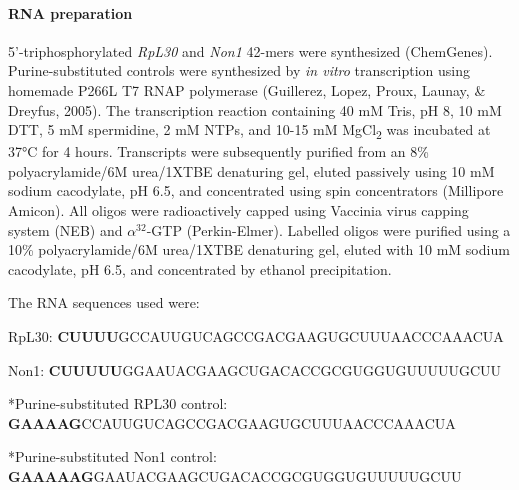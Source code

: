 \documentclass[12pt,oneside]{reedthesis}
\begin{document}
\hypertarget{rna-preparation}{%
\paragraph{RNA preparation}\label{rna-preparation}}

5'-triphosphorylated \emph{RpL30} and \emph{Non1} 42-mers were synthesized (ChemGenes). Purine-substituted controls were synthesized by \emph{in vitro} transcription using homemade P266L T7 RNAP polymerase (Guillerez, Lopez, Proux, Launay, \& Dreyfus, 2005). The transcription reaction containing 40 mM Tris, pH 8, 10 mM DTT, 5 mM spermidine, 2 mM NTPs, and 10-15 mM MgCl\textsubscript{2} was incubated at 37°C for 4 hours. Transcripts were subsequently purified from an 8\% polyacrylamide/6M urea/1XTBE denaturing gel, eluted passively using 10 mM sodium cacodylate, pH 6.5, and concentrated using spin concentrators (Millipore Amicon). All oligos were radioactively capped using Vaccinia virus capping system (NEB) and \(\alpha^{32}\)-GTP (Perkin-Elmer). Labelled oligos were purified using a 10\% polyacrylamide/6M urea/1XTBE denaturing gel, eluted with 10 mM sodium cacodylate, pH 6.5, and concentrated by ethanol precipitation.

The RNA sequences used were:

RpL30:
\textbf{\hfill\break
}
\textbf{CUUUU}GCCAUUGUCAGCCGACGAAGUGCUUUAACCCAAACUA

Non1:
\textbf{\hfill\break
}
\textbf{CUUUUU}GGAAUACGAAGCUGACACCGCGUGGUGUUUUUGCUU

*Purine-substituted RPL30 control:
\textbf{\hfill\break
}
\textbf{GAAAAG}CCAUUGUCAGCCGACGAAGUGCUUUAACCCAAACUA

*Purine-substituted Non1 control:
\textbf{\hfill\break
}
\textbf{GAAAAAG}GAAUACGAAGCUGACACCGCGUGGUGUUUUUGCUU

\end{document}
